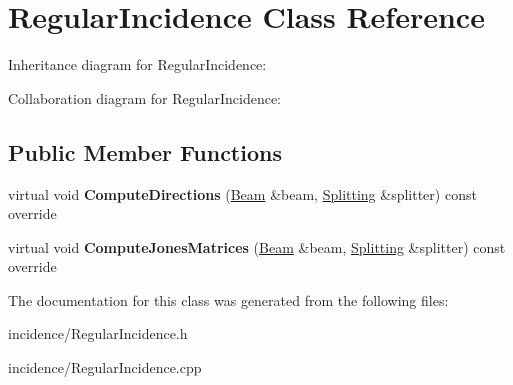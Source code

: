\hypertarget{class_regular_incidence}{}\section{Regular\+Incidence Class Reference}
\label{class_regular_incidence}


Inheritance diagram for Regular\+Incidence\+:


Collaboration diagram for Regular\+Incidence\+:
\subsection*{Public Member Functions}
\begin{DoxyCompactItemize}
\item 
\mbox{\label{class_regular_incidence_a8ecdb90673e76607d064435681107169}} 
virtual void {\bfseries Compute\+Directions} (\mbox{\hyperlink{class_beam}{Beam}} \&beam, \mbox{\hyperlink{class_splitting}{Splitting}} \&splitter) const override
\item 
\mbox{\label{class_regular_incidence_aef24ed873633d428aa0d9bd0f898fe13}} 
virtual void {\bfseries Compute\+Jones\+Matrices} (\mbox{\hyperlink{class_beam}{Beam}} \&beam, \mbox{\hyperlink{class_splitting}{Splitting}} \&splitter) const override
\end{DoxyCompactItemize}


The documentation for this class was generated from the following files\+:\begin{DoxyCompactItemize}
\item 
incidence/Regular\+Incidence.\+h\item 
incidence/Regular\+Incidence.\+cpp\end{DoxyCompactItemize}
